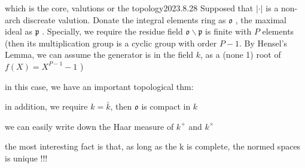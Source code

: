 \begin{diary}{which is the core, valutions or the topology}{2023.8.28}
    Supposed that $| \cdot |$ is a non-arch discreate valution. Donate the integral elements ring as $\mathfrak{o}$ , the maximal ideal as $\mathfrak{p}$ . Specially, we require the residue field $\mathfrak{o} \backslash \mathfrak{p}$ is finite with $P$ elements (then its multiplication group is a cyclic group with order $P-1$. By Hensel's Lemma, we can assume the generator is in the field $k$, as a (none 1) root of $f(X) = X^{P-1} - 1$ )

    in this case, we have an important topological thm:

    \begin{theorem}
        in addition, we require $k = \bar{k}$, then $\mathfrak{o}$ is compact in $k$
    \end{theorem}

    we can easily write down the Haar measure of $k^+$ and $k^{\times}$

    the most interesting fact is that, as long as the k is complete, the normed spaces is unique !!!


\end{diary}